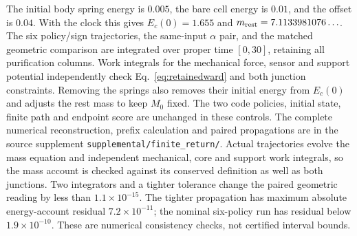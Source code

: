 \documentclass[12pt]{article}
\theoremstyle{definition}
\theoremstyle{remark}
\begin{document}
The initial body spring energy is $0.005$, the bare cell energy is
$0.01$, and the offset is $0.04$. With the clock this gives
$E_c(0)=1.655$ and $m_{\rm rest}=7.1133981076\ldots$.
The six policy/sign trajectories, the same-input $\alpha$ pair,
and the matched geometric comparison
are integrated over proper time $[0,30]$, retaining all purification
columns. Work integrals for the mechanical force, sensor and support
potential independently check Eq.~\eqref{eq:retainedward} and both
junction constraints. Removing the springs also removes their initial
energy from $E_c(0)$ and adjusts the rest mass to keep $M_0$ fixed.
The two code policies, initial state, finite path and endpoint score
are unchanged in these controls.
The complete numerical reconstruction, prefix calculation and paired
propagations are in the source supplement
\texttt{supplemental/finite\_return/}. Actual trajectories
evolve the mass equation and independent mechanical, core and support
work integrals, so the mass account is checked against its conserved
definition as well as both junctions.
Two integrators and a tighter tolerance change the paired geometric
reading by less than $1.1\times10^{-15}$. The tighter propagation
has maximum absolute energy-account residual $7.2\times10^{-11}$;
the nominal six-policy run has residual below $1.9\times10^{-10}$.
These are numerical consistency checks, not certified interval bounds.
\end{document}
